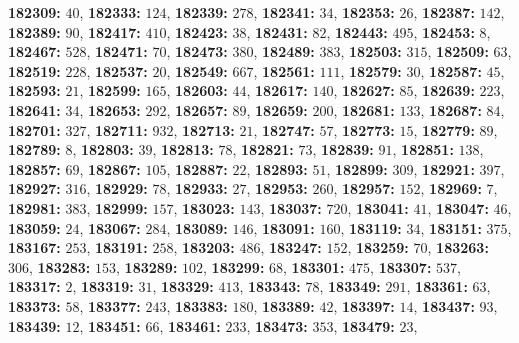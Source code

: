 \textsf{\bfseries 182309:} $40$, \textsf{\bfseries 182333:} $124$, \textsf{\bfseries 182339:} $278$, \textsf{\bfseries 182341:} $34$, \textsf{\bfseries 182353:} $26$, \textsf{\bfseries 182387:} $142$, \textsf{\bfseries 182389:} $90$, \textsf{\bfseries 182417:} $410$, \textsf{\bfseries 182423:} $38$, \textsf{\bfseries 182431:} $82$, \textsf{\bfseries 182443:} $495$, \textsf{\bfseries 182453:} $8$, \textsf{\bfseries 182467:} $528$, \textsf{\bfseries 182471:} $70$, \textsf{\bfseries 182473:} $380$, \textsf{\bfseries 182489:} $383$, \textsf{\bfseries 182503:} $315$, \textsf{\bfseries 182509:} $63$, \textsf{\bfseries 182519:} $228$, \textsf{\bfseries 182537:} $20$, \textsf{\bfseries 182549:} $667$, \textsf{\bfseries 182561:} $111$, \textsf{\bfseries 182579:} $30$, \textsf{\bfseries 182587:} $45$, \textsf{\bfseries 182593:} $21$, \textsf{\bfseries 182599:} $165$, \textsf{\bfseries 182603:} $44$, \textsf{\bfseries 182617:} $140$, \textsf{\bfseries 182627:} $85$, \textsf{\bfseries 182639:} $223$, \textsf{\bfseries 182641:} $34$, \textsf{\bfseries 182653:} $292$, \textsf{\bfseries 182657:} $89$, \textsf{\bfseries 182659:} $200$, \textsf{\bfseries 182681:} $133$, \textsf{\bfseries 182687:} $84$, \textsf{\bfseries 182701:} $327$, \textsf{\bfseries 182711:} $932$, \textsf{\bfseries 182713:} $21$, \textsf{\bfseries 182747:} $57$, \textsf{\bfseries 182773:} $15$, \textsf{\bfseries 182779:} $89$, \textsf{\bfseries 182789:} $8$, \textsf{\bfseries 182803:} $39$, \textsf{\bfseries 182813:} $78$, \textsf{\bfseries 182821:} $73$, \textsf{\bfseries 182839:} $91$, \textsf{\bfseries 182851:} $138$, \textsf{\bfseries 182857:} $69$, \textsf{\bfseries 182867:} $105$, \textsf{\bfseries 182887:} $22$, \textsf{\bfseries 182893:} $51$, \textsf{\bfseries 182899:} $309$, \textsf{\bfseries 182921:} $397$, \textsf{\bfseries 182927:} $316$, \textsf{\bfseries 182929:} $78$, \textsf{\bfseries 182933:} $27$, \textsf{\bfseries 182953:} $260$, \textsf{\bfseries 182957:} $152$, \textsf{\bfseries 182969:} $7$, \textsf{\bfseries 182981:} $383$, \textsf{\bfseries 182999:} $157$, \textsf{\bfseries 183023:} $143$, \textsf{\bfseries 183037:} $720$, \textsf{\bfseries 183041:} $41$, \textsf{\bfseries 183047:} $46$, \textsf{\bfseries 183059:} $24$, \textsf{\bfseries 183067:} $284$, \textsf{\bfseries 183089:} $146$, \textsf{\bfseries 183091:} $160$, \textsf{\bfseries 183119:} $34$, \textsf{\bfseries 183151:} $375$, \textsf{\bfseries 183167:} $253$, \textsf{\bfseries 183191:} $258$, \textsf{\bfseries 183203:} $486$, \textsf{\bfseries 183247:} $152$, \textsf{\bfseries 183259:} $70$, \textsf{\bfseries 183263:} $306$, \textsf{\bfseries 183283:} $153$, \textsf{\bfseries 183289:} $102$, \textsf{\bfseries 183299:} $68$, \textsf{\bfseries 183301:} $475$, \textsf{\bfseries 183307:} $537$, \textsf{\bfseries 183317:} $2$, \textsf{\bfseries 183319:} $31$, \textsf{\bfseries 183329:} $413$, \textsf{\bfseries 183343:} $78$, \textsf{\bfseries 183349:} $291$, \textsf{\bfseries 183361:} $63$, \textsf{\bfseries 183373:} $58$, \textsf{\bfseries 183377:} $243$, \textsf{\bfseries 183383:} $180$, \textsf{\bfseries 183389:} $42$, \textsf{\bfseries 183397:} $14$, \textsf{\bfseries 183437:} $93$, \textsf{\bfseries 183439:} $12$, \textsf{\bfseries 183451:} $66$, \textsf{\bfseries 183461:} $233$, \textsf{\bfseries 183473:} $353$, \textsf{\bfseries 183479:} $23$, 
